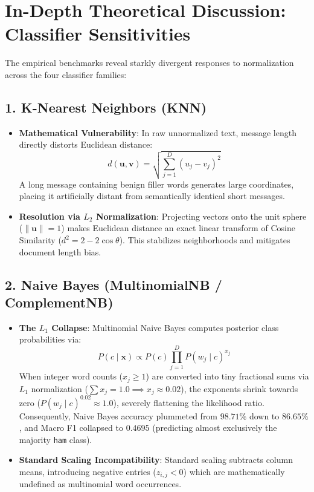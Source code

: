 \documentclass[12pt]{article}
\begin{document}
\newpage
\section{In-Depth Theoretical Discussion: Classifier Sensitivities}

The empirical benchmarks reveal starkly divergent responses to normalization across the four classifier families:

\subsection{1. K-Nearest Neighbors (KNN)}
\begin{itemize}
    \item \textbf{Mathematical Vulnerability}: In raw unnormalized text, message length directly distorts Euclidean distance:
    \begin{equation}
        d(\mathbf{u}, \mathbf{v}) = \sqrt{\sum_{j=1}^{D} (u_j - v_j)^2}
    \end{equation}
    A long message containing benign filler words generates large coordinates, placing it artificially distant from semantically identical short messages.
    \item \textbf{Resolution via $L_2$ Normalization}: Projecting vectors onto the unit sphere ($\|\mathbf{u}\| = 1$) makes Euclidean distance an exact linear transform of Cosine Similarity ($d^2 = 2 - 2\cos\theta$). This stabilizes neighborhoods and mitigates document length bias.
\end{itemize}

\subsection{2. Naive Bayes (MultinomialNB / ComplementNB)}
\begin{itemize}
    \item \textbf{The $L_1$ Collapse}: Multinomial Naive Bayes computes posterior class probabilities via:
    \begin{equation}
        P(c \mid \mathbf{x}) \propto P(c) \prod_{j=1}^{D} P(w_j \mid c)^{x_j}
    \end{equation}
    When integer word counts ($x_j \ge 1$) are converted into tiny fractional sums via $L_1$ normalization ($\sum x_j = 1.0 \implies x_j \approx 0.02$), the exponents shrink towards zero ($P(w_j \mid c)^{0.02} \approx 1.0$), severely flattening the likelihood ratio. Consequently, Naive Bayes accuracy plummeted from $98.71\%$ down to $86.65\%$, and Macro F1 collapsed to $0.4695$ (predicting almost exclusively the majority \texttt{ham} class).
    \item \textbf{Standard Scaling Incompatibility}: Standard scaling subtracts column means, introducing negative entries ($z_{i,j} < 0$) which are mathematically undefined as multinomial word occurrences.
\end{itemize}
\end{document}
